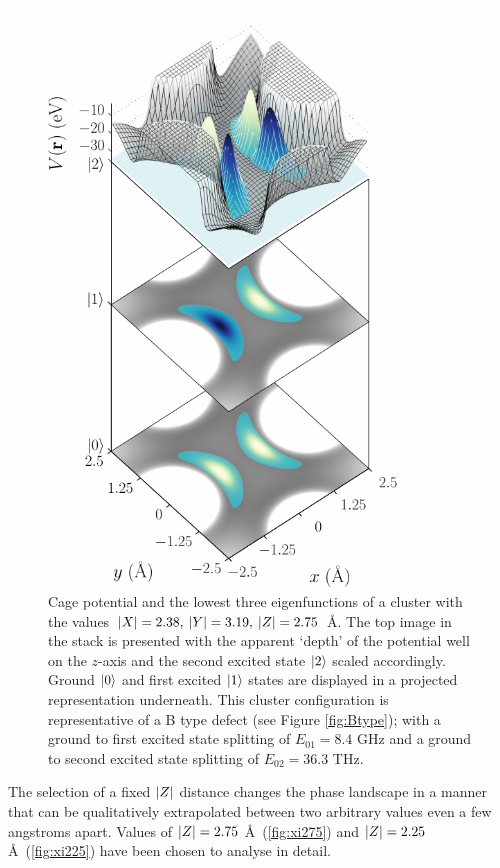 \begin{figure}[p]
\includegraphics[width=0.85\textwidth]{figures/wfstackB}
\caption[B Type Energy States]{\label{fig:wfstackB}Cage potential and the lowest three eigenfunctions of a cluster with the values $\lvert X\rvert=2.38, \: \lvert Y\rvert = 3.19, \: \lvert Z\rvert = 2.75$ \AA. The top image in the stack is presented with the apparent `depth' of the potential well on the $z$-axis and the second excited state $\lvert2\rangle$ scaled accordingly. Ground $\lvert0\rangle$ and first excited $\lvert1\rangle$ states are displayed in a projected representation underneath. This cluster configuration is representative of a B type defect (see Figure \ref{fig:Btype}); with a ground to first excited state splitting of $E_{01} = 8.4$ GHz and a ground to second excited state splitting of $E_{02} = 36.3$ THz.}
\end{figure}

The selection of a fixed $\lvert Z\rvert$ distance changes the phase landscape in a manner that can be qualitatively extrapolated between two arbitrary values even a few angstroms apart.
Values of $\lvert Z\rvert = 2.75$ \AA\ (\cref{fig:xi275}) and $\lvert Z\rvert = 2.25$ \AA\ (\cref{fig:xi225}) have been chosen to analyse in detail.

